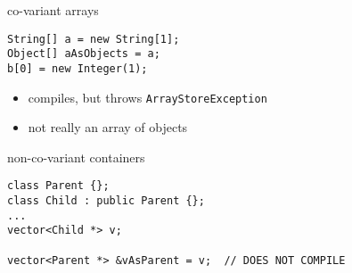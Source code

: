 \begin{frame}[fragile,label=covArr]{co-variant arrays}
\lstset{language=Java,style=small}
\begin{lstlisting}
String[] a = new String[1];
Object[] aAsObjects = a;
b[0] = new Integer(1);
\end{lstlisting}
\begin{itemize}
\item compiles, but throws \texttt{ArrayStoreException}
\item not really an array of objects
\end{itemize}
\end{frame}

\begin{frame}[fragile,label=nonCovArr]{non-co-variant containers}
\lstset{language=C++,style=small}
\begin{lstlisting}
class Parent {};
class Child : public Parent {};
...
vector<Child *> v;

vector<Parent *> &vAsParent = v;  // DOES NOT COMPILE
\end{lstlisting}
\end{frame}
